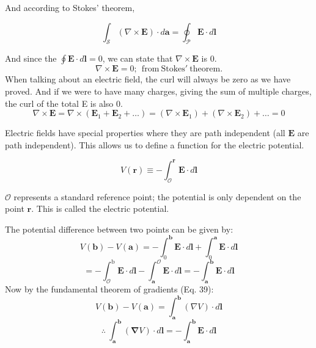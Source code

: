 And according to Stokes' theorem,

\begin{equation}
\int_{\mathcal{S}}(\nabla \times \mathbf{E}) \cdot d \mathbf{a}=\oint_{\mathcal{P}} \mathbf{E} \cdot d \mathbf{l}
\end{equation}
 
 And since the \( \oint \mathbf{E} \cdot d \mathbf{l}= 0 \), we can state that \( \nabla \times \mathbf{E} \) is 0.
 \begin{equation}
\boxed{ \nabla \times \mathbf{E} = 0};\ \mathrm{\ from\ Stokes'\ theorem.}
 \end{equation}
When talking about an electric field, the curl will always be zero as we have proved. And if we were to have many charges, giving the sum of multiple charges, the curl of the total E is also 0.
\begin{equation}
\nabla \times \mathbf{E}=\nabla \times\left(\mathbf{E}_{1}+\mathbf{E}_{2}+\ldots\right)=\left(\nabla \times \mathbf{E}_{1}\right)+\left(\nabla \times \mathbf{E}_{2}\right)+\ldots=0
\end{equation}
\newpage

Electric fields have special properties where they are path independent (all \( \mathbf{E} \) are path independent). This allows us to define a function for the electric potential.

\begin{equation}
V(\mathbf{r}) \equiv-\int_{\mathcal{O}}^{\mathbf{r}} \mathbf{E} \cdot d \mathbf{l}
\end{equation}

\( \mathcal{O} \) represents a standard reference point; the potential is only dependent on the point \( \mathbf{r} \). This is called the electric potential. 

The potential difference between two points can be given by:
\begin{equation}
V(\mathbf{b})-V(\mathbf{a})=-\int_{0}^{\mathbf{b}} \mathbf{E} \cdot d \mathbf{l}+\int_{0}^{\mathbf{a}} \mathbf{E} \cdot d \mathbf{l}
\end{equation}
\begin{equation}
=-\int_{\mathcal{O}}^{\mathrm{b}} \mathbf{E} \cdot d \mathbf{l}-\int_{\mathbf{a}}^{\mathcal{O}} \mathbf{E} \cdot d \mathbf{l}=-\int_{\mathbf{a}}^{\mathbf{b}} \mathbf{E} \cdot d \mathbf{l}
\end{equation}
 Now by the fundamental theorem of gradients (Eq. 39):
 \begin{equation}
 V(\mathbf{b})-V(\mathbf{a})=\int_{\mathbf{a}}^{\mathbf{b}}(\nabla V) \cdot d \mathbf{l}
 \end{equation}
\begin{equation}
\therefore\ \int_{\mathbf{a}}^{\mathbf{b}}(\mathbf{\nabla} V) \cdot d \mathbf{l}=-\int_{\mathbf{a}}^{\mathbf{b}} \mathbf{E} \cdot d \mathbf{l}
\end{equation}

